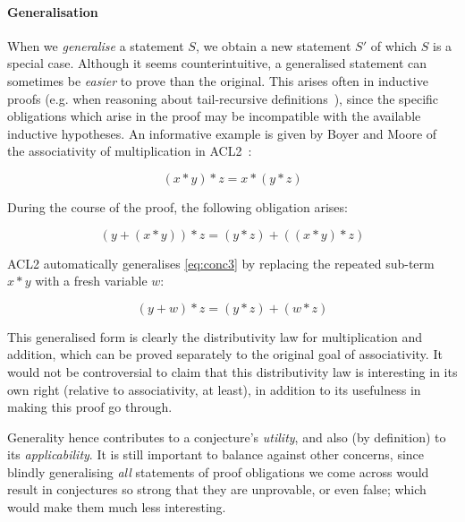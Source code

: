 \paragraph{Generalisation}

\providecommand{\coq}[1]{\lstinline[language=ML]|#1|}

When we \emph{generalise} a statement $S$, we obtain a new statement $S'$ of
which $S$ is a special case. Although it seems counterintuitive, a generalised
statement can sometimes be \emph{easier} to prove than the original. This arises
often in inductive proofs (e.g. when reasoning about tail-recursive
definitions~\cite{kapur2003automatic}), since the specific obligations which
arise in the proof may be incompatible with the available inductive hypotheses.
An informative example is given by Boyer and Moore of the associativity of
multiplication in ACL2~\cite{boyer1983proof}:

$$(x * y) * z = x * (y * z)$$

During the course of the proof, the following obligation arises:

\begin{equation}
  \tag{conc3}
  (y + (x * y)) * z = (y * z) + ((x * y) * z)
  \label{eq:conc3}
\end{equation}

ACL2 automatically generalises \eqref{eq:conc3} by replacing the repeated
sub-term $x * y$ with a fresh variable $w$:

\begin{equation}
  \tag{conc4}
  (y + w) * z = (y * z) + (w * z)
  \label{eq:conc4}
\end{equation}

This generalised form is clearly the distributivity law for multiplication and
addition, which can be proved separately to the original goal of
associativity. It would not be controversial to claim that this distributivity
law is interesting in its own right (relative to associativity, at least), in
addition to its usefulness in making this proof go through.


Generality hence contributes to a conjecture's \emph{utility}, and also (by
definition) to its \emph{applicability}. It is still important to balance
against other concerns, since blindly generalising \emph{all} statements of
proof obligations we come across would result in conjectures so strong that they
are unprovable, or even false; which would make them much less interesting.

